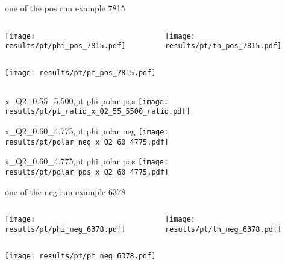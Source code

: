 \begin{frame}{one of the pos run example 7815}
\begin{columns}
\begin{column}[T]{0.5\textwidth}
\texttt{[image: results/pt/phi\_pos\_7815.pdf]}
\end{column}
\begin{column}[T]{0.5\textwidth}
\texttt{[image: results/pt/th\_pos\_7815.pdf]}
\end{column}
\end{columns}
\begin{columns}
\begin{column}[T]{0.5\textwidth}
\texttt{[image: results/pt/pt\_pos\_7815.pdf]}
\end{column}
\begin{column}[T]{0.5\textwidth}
\end{column}
\end{columns}
\end{frame}
\begin{frame}{x\_Q2\_0.55\_5.500,pt phi polar pos}
\texttt{[image: results/pt/pt\_ratio\_x\_Q2\_55\_5500\_ratio.pdf]}
\end{frame}
\begin{frame}{x\_Q2\_0.60\_4.775,pt phi polar neg}
\texttt{[image: results/pt/polar\_neg\_x\_Q2\_60\_4775.pdf]}
\end{frame}
\begin{frame}{x\_Q2\_0.60\_4.775,pt phi polar pos}
\texttt{[image: results/pt/polar\_pos\_x\_Q2\_60\_4775.pdf]}
\end{frame}
\begin{frame}{one of the neg run example 6378}
\begin{columns}
\begin{column}[T]{0.5\textwidth}
\texttt{[image: results/pt/phi\_neg\_6378.pdf]}
\end{column}
\begin{column}[T]{0.5\textwidth}
\texttt{[image: results/pt/th\_neg\_6378.pdf]}
\end{column}
\end{columns}
\texttt{[image: results/pt/pt\_neg\_6378.pdf]}
\end{frame}
